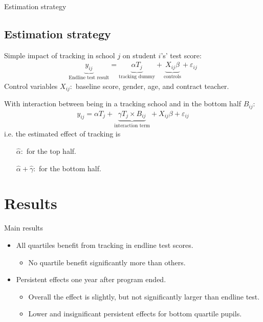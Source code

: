 \documentclass[9pt]{beamer}
\newcommand{\comment}[1]{}  %
\numberwithin{equation}{section}
\begin{document}
\begin{frame}{Estimation strategy}
  \subsection{Estimation strategy}
  Simple impact of tracking in school $j$ on student $i$'s' test score:
  \begin{align}
    \underbrace{y_{ij}}_\text{Endline test result} = \underbrace{\alpha T_j}_\text{tracking dummy} + \underbrace{X_{ij}\beta}_\text{controls} + \varepsilon_{ij}
  \end{align}
  Control variables $X_{ij}:$ baseline score, gender, age, and contract teacher.

  With interaction between being in a tracking school and in the bottom half $B_{ij}:$
  \begin{align}
    y_{ij} = \alpha T_j + \underbrace{\gamma T_j\times B_{ij}}_\text{interaction term} + X_{ij}\beta + \varepsilon_{ij}
  \end{align}
  i.e. the estimated effect of tracking is
  \begin{itemize}
    \item[$\hat{\alpha}:$] for the top half.
    \item[$\hat{\alpha}+\hat{\gamma}:$] for the bottom half.
  \end{itemize}
\end{frame}

\section{Results}


\begin{frame}{Main results}
  \begin{itemize}
    \item All quartiles benefit from tracking in endline test scores.
    \begin{itemize}
      \item No quartile benefit significantly more than others.
    \end{itemize}
    \item Persistent effects one year after program ended.
    \comment{The classes were united after end-of-funding in all but 5 schools.}
    \begin{itemize}
      \item Overall the effect is slightly, but not significantly larger than endline test.
      \item Lower and insignificant persistent effects for bottom quartile pupils.
    \end{itemize}
  \end{itemize}
\end{frame}
\end{document}

